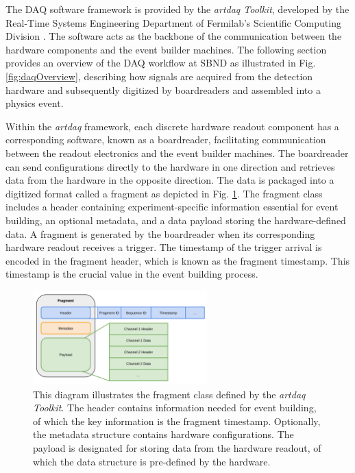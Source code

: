 The DAQ software framework is provided by the \textit{artdaq Toolkit}, developed by the Real-Time Systems Engineering Department of Fermilab's Scientific Computing Division \cite{artdaq_note}.
The software acts as the backbone of the communication between the hardware components and the event builder machines.
The following section provides an overview of the DAQ workflow at SBND as illustrated in Fig. \ref{fig:daqOverview}, describing how signals are acquired from the detection hardware and subsequently digitized by boardreaders and assembled into a physics event.

Within the \textit{artdaq} framework, each discrete hardware readout component has a corresponding software, known as a boardreader, facilitating communication between the readout electronics and the event builder machines.
The boardreader can send configurations directly to the hardware in one direction and retrieves data from the hardware in the opposite direction.
The data is packaged into a digitized format called a fragment as depicted in Fig. \ref{fig:fragmentDiagram}. 
The fragment class includes a header containing experiment-specific information essential for event building, an optional metadata, and a data payload storing the hardware-defined data.
A fragment is generated by the boardreader when its corresponding hardware readout receives a trigger.
The timestamp of the trigger arrival is encoded in the fragment header, which is known as the fragment timestamp.
This timestamp is the crucial value in the event building process.

\begin{figure}[htbp!] 
\centering    
\includegraphics[width=0.6\textwidth]{Fragment_Diagram}
\caption[FragmentDiagram]{This diagram illustrates the fragment class defined by the \textit{artdaq Toolkit}. The header contains information needed for event building, of which the key information is the fragment timestamp. Optionally, the metadata structure contains hardware configurations. The payload is designated for storing data from the hardware readout, of which the data structure is pre-defined by the hardware. }
\label{fig:fragmentDiagram}
\end{figure}

